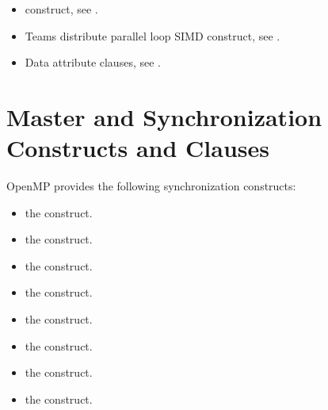 \crossreferences
\begin{itemize}
\item {} construct, see 
.

\item Teams distribute parallel loop SIMD construct, see 
.

\item Data attribute clauses, see 
.
\end{itemize}


















\section{Master and Synchronization Constructs and Clauses}
\label{sec:Master and Synchronization Constructs and Clauses}
OpenMP provides the following synchronization constructs:
\begin{itemize}
\item the  construct.

\item the  construct.

\item the  construct.

\item the  construct.

\item the  construct.

\item the  construct.

\item the  construct.

\item the  construct.
\end{itemize}










